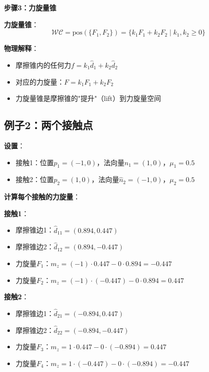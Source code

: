\documentclass[12pt,a4paper]{article}
\begin{document}
\textbf{步骤3：力旋量锥}

\textbf{力旋量锥}：
\begin{equation}
\mathcal{WC} = \text{pos}(\{F_1, F_2\}) = \{k_1 F_1 + k_2 F_2 \mid k_1, k_2 \geq 0\}
\end{equation}

\textbf{物理解释}：
\begin{itemize}
\item 摩擦锥内的任何力$f = k_1 \hat{d}_1 + k_2 \hat{d}_2$
\item 对应的力旋量：$F = k_1 F_1 + k_2 F_2$
\item 力旋量锥是摩擦锥的"提升"（lift）到力旋量空间
\end{itemize}

\subsection{例子2：两个接触点}

\textbf{设置}：
\begin{itemize}
\item 接触1：位置$p_1 = (-1, 0)$，法向量$\hat{n}_1 = (1, 0)$，$\mu_1 = 0.5$
\item 接触2：位置$p_2 = (1, 0)$，法向量$\hat{n}_2 = (-1, 0)$，$\mu_2 = 0.5$
\end{itemize}

\textbf{计算每个接触的力旋量}：

\textbf{接触1}：
\begin{itemize}
\item 摩擦锥边1：$\hat{d}_{11} = (0.894, 0.447)$
\item 摩擦锥边2：$\hat{d}_{12} = (0.894, -0.447)$
\item 力旋量$F_1$：$m_z = (-1) \cdot 0.447 - 0 \cdot 0.894 = -0.447$
\item 力旋量$F_2$：$m_z = (-1) \cdot (-0.447) - 0 \cdot 0.894 = 0.447$
\end{itemize}

\textbf{接触2}：
\begin{itemize}
\item 摩擦锥边1：$\hat{d}_{21} = (-0.894, 0.447)$
\item 摩擦锥边2：$\hat{d}_{22} = (-0.894, -0.447)$
\item 力旋量$F_3$：$m_z = 1 \cdot 0.447 - 0 \cdot (-0.894) = 0.447$
\item 力旋量$F_4$：$m_z = 1 \cdot (-0.447) - 0 \cdot (-0.894) = -0.447$
\end{itemize}
\end{document}
